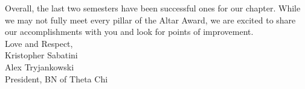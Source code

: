 Overall, the last two semesters have been successful ones for our chapter. While we may not fully meet every pillar of the Altar Award, we are excited to share our accomplishments with you and look for points of improvement. \\

Love and Respect, \\
Kristopher Sabatini \\
Alex Tryjankowski \\
President, BN of Theta Chi \\
